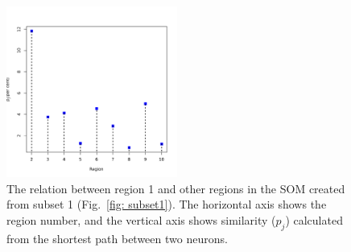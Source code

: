 \begin{figure}
        \centering
        \includegraphics[width=0.5\textwidth]{../../images0.01/M31/2D/image_subsets/similarity_plot.pdf}
    \caption{The relation between region 1 and other regions in the SOM created from subset 1 (Fig.~\ref{fig: subset1}). 
    The  horizontal axis shows the region number, and the vertical axis shows similarity ($p_j$) calculated from the shortest path between two neurons.}
    \label{fig: sim_subset1}
\end{figure}
